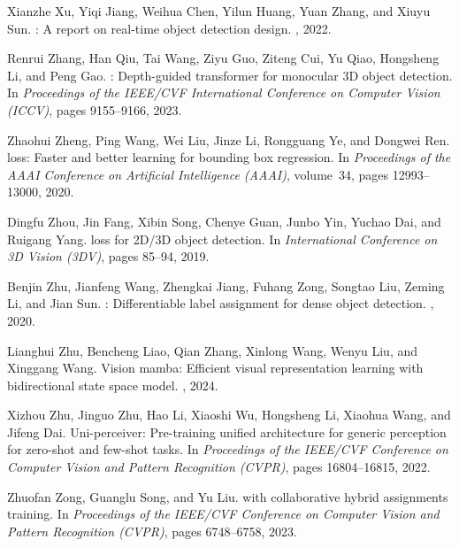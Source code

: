 \documentclass[10pt,twocolumn,letterpaper]{article}
\begin{document}
{\begin{thebibliography}{10}
		Xianzhe Xu, Yiqi Jiang, Weihua Chen, Yilun Huang, Yuan Zhang, and Xiuyu Sun.
		: A report on real-time object detection design.
		, 2022.
		
		Renrui Zhang, Han Qiu, Tai Wang, Ziyu Guo, Ziteng Cui, Yu Qiao, Hongsheng Li,
		and Peng Gao.
		: Depth-guided transformer for monocular {3D} object
		detection.
		\newblock In {\em Proceedings of the IEEE/CVF International Conference on
			Computer Vision (ICCV)}, pages 9155--9166, 2023.
		
		Zhaohui Zheng, Ping Wang, Wei Liu, Jinze Li, Rongguang Ye, and Dongwei Ren.
		 loss: Faster and better learning for bounding box
		regression.
		\newblock In {\em Proceedings of the AAAI Conference on Artificial Intelligence
			(AAAI)}, volume~34, pages 12993--13000, 2020.
		
		Dingfu Zhou, Jin Fang, Xibin Song, Chenye Guan, Junbo Yin, Yuchao Dai, and
		Ruigang Yang.
		 loss for {2D}/{3D} object detection.
		\newblock In {\em International Conference on 3D Vision (3DV)}, pages 85--94,
		2019.
		
		Benjin Zhu, Jianfeng Wang, Zhengkai Jiang, Fuhang Zong, Songtao Liu, Zeming Li,
		and Jian Sun.
		: Differentiable label assignment for dense object
		detection.
		, 2020.
		
		Lianghui Zhu, Bencheng Liao, Qian Zhang, Xinlong Wang, Wenyu Liu, and Xinggang
		Wang.
		\newblock Vision mamba: Efficient visual representation learning with
		bidirectional state space model.
		, 2024.
		
		Xizhou Zhu, Jinguo Zhu, Hao Li, Xiaoshi Wu, Hongsheng Li, Xiaohua Wang, and
		Jifeng Dai.
		\newblock Uni-perceiver: Pre-training unified architecture for generic
		perception for zero-shot and few-shot tasks.
		\newblock In {\em Proceedings of the IEEE/CVF Conference on Computer Vision and
			Pattern Recognition (CVPR)}, pages 16804--16815, 2022.
		
		Zhuofan Zong, Guanglu Song, and Yu Liu.
		 with collaborative hybrid assignments training.
		\newblock In {\em Proceedings of the IEEE/CVF Conference on Computer Vision and
			Pattern Recognition (CVPR)}, pages 6748--6758, 2023.
		
	\end{thebibliography}
	
	}
\end{document}
